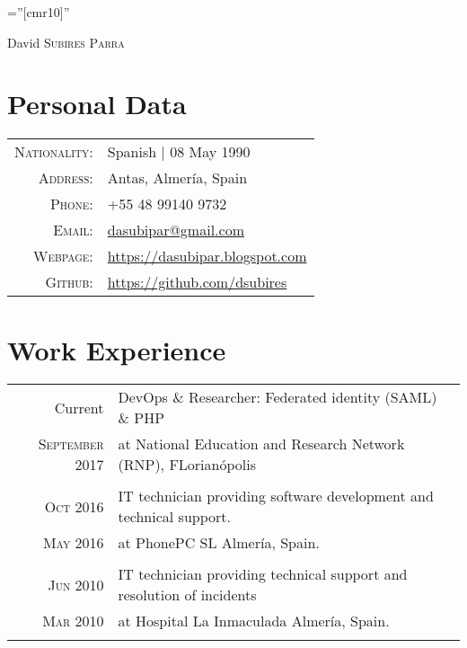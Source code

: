 \documentclass[a4paper,10pt]{article}
\begin{document}
\pagestyle{empty} %

\font\fb=''[cmr10]'' %

\par{\centering
		{\Huge David \textsc{Subires Parra}
	}\bigskip\par}

\section*{Personal Data}

\begin{tabular}{rp{12cm}}
    \textsc{Nationality:} & Spanish | 08 May 1990 \\
    \textsc{Address:}     & Antas, Almería, Spain \\
    \textsc{Phone:}       & +55 48 99140 9732 \\
    \textsc{Email:}       & \href {mailto:dasubipar@gmail.com}{dasubipar@gmail.com} \\
   \textsc{Webpage:}     & \url {https://dasubipar.blogspot.com} \\
    \textsc{Github:}      & \url{https://github.com/dsubires}
\end{tabular}

\section*{Work Experience}
\begin{tabular}{r|p{11cm}}


\textsc Current & DevOps \& Researcher: Federated identity (SAML) \& PHP
\\\textsc{September 2017} &  at National Education and Research Network (RNP), FLorianópolis  \normalsize \\\multicolumn{2}{c}{} \\



\textsc{Oct} 2016 & IT technician providing software development and technical support.\\\textsc{May 2016} & at PhonePC SL Almería, Spain. \normalsize \\\multicolumn{2}{c}{} \\


\textsc{Jun} 2010 & IT technician providing technical support and resolution of incidents\\\textsc{Mar 2010} & at Hospital La Inmaculada Almería, Spain. \normalsize \\\multicolumn{2}{c}{} \\


\end{tabular}
\end{document}
